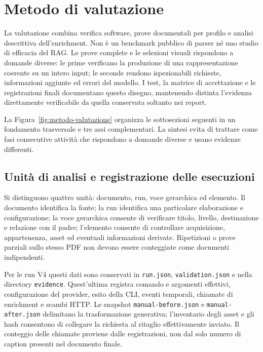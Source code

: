 \section{Metodo di valutazione}
\label{sec:valutazione}

La valutazione combina verifica software, prove documentali per profilo e analisi descrittiva dell'enrichment. Non è un benchmark pubblico di parser né uno studio di efficacia del RAG. Le prove complete e le selezioni visuali rispondono a domande diverse: le prime verificano la produzione di una rappresentazione coerente su un intero input; le seconde rendono ispezionabili richieste, informazioni aggiunte ed errori del modello. I test, la matrice di accettazione e le registrazioni finali documentano questo disegno, mantenendo distinta l'evidenza direttamente verificabile da quella conservata soltanto nei report.

La Figura~\ref{fig:metodo-valutazione} organizza le sottosezioni seguenti in un fondamento trasversale e tre assi complementari. La sintesi evita di trattare come fasi consecutive attività che rispondono a domande diverse e usano evidenze differenti.


\FloatBarrier

\subsection{Unità di analisi e registrazione delle esecuzioni}

Si distinguono quattro unità: documento, run, voce gerarchica ed elemento. Il documento identifica la fonte; la run identifica una particolare elaborazione e configurazione; la voce gerarchica consente di verificare titolo, livello, destinazione e relazione con il padre; l'elemento consente di controllare acquisizione, appartenenza, asset ed eventuali informazioni derivate. Ripetizioni o prove parziali sullo stesso PDF non devono essere conteggiate come documenti indipendenti.

Per le run V4 questi dati sono conservati in \texttt{run.json}, \texttt{validation.json} e nella directory \texttt{evidence}. Quest'ultima registra comando e argomenti effettivi, configurazione del provider, esito della CLI, eventi temporali, chiamate di enrichment e scambi HTTP. Le snapshot \texttt{manual-before.json} e \texttt{manual-after.json} delimitano la trasformazione generativa; l'inventario degli asset e gli hash consentono di collegare la richiesta al ritaglio effettivamente inviato. Il conteggio delle chiamate proviene dalle registrazioni, non dal solo numero di caption presenti nel documento finale.

